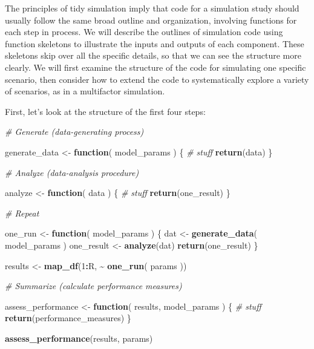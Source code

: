 \documentclass[
]{book}
\newenvironment{Shaded}{\begin{snugshade}}{\end{snugshade}}
\newcommand{\CommentTok}[1]{\textcolor[rgb]{0.56,0.35,0.01}{\textit{#1}}}
\newcommand{\ControlFlowTok}[1]{\textcolor[rgb]{0.13,0.29,0.53}{\textbf{#1}}}
\newcommand{\DecValTok}[1]{\textcolor[rgb]{0.00,0.00,0.81}{#1}}
\newcommand{\FunctionTok}[1]{\textcolor[rgb]{0.13,0.29,0.53}{\textbf{#1}}}
\newcommand{\NormalTok}[1]{#1}
\newcommand{\OtherTok}[1]{\textcolor[rgb]{0.56,0.35,0.01}{#1}}
\newcommand{\SpecialCharTok}[1]{\textcolor[rgb]{0.81,0.36,0.00}{\textbf{#1}}}
\begin{document}
The principles of tidy simulation imply that code for a simulation study should usually follow the same broad outline and organization, involving functions for each step in process.
We will describe the outlines of simulation code using function skeletons to illustrate the inputs and outputs of each component.
These skeletons skip over all the specific details, so that we can see the structure more clearly.
We will first examine the structure of the code for simulating one specific scenario, then consider how to extend the code to systematically explore a variety of scenarios, as in a multifactor simulation.

First, let's look at the structure of the first four steps:

\begin{Shaded}
\begin{Highlighting}[]
\CommentTok{\# Generate (data{-}generating process)}

\NormalTok{generate\_data }\OtherTok{\textless{}{-}} \ControlFlowTok{function}\NormalTok{( model\_params ) \{}
  \CommentTok{\# stuff}
  \FunctionTok{return}\NormalTok{(data)}
\NormalTok{\}}

\CommentTok{\# Analyze (data{-}analysis procedure)}

\NormalTok{analyze }\OtherTok{\textless{}{-}} \ControlFlowTok{function}\NormalTok{( data ) \{}
  \CommentTok{\# stuff}
  \FunctionTok{return}\NormalTok{(one\_result)}
\NormalTok{\}}

\CommentTok{\# Repeat}

\NormalTok{one\_run }\OtherTok{\textless{}{-}} \ControlFlowTok{function}\NormalTok{( model\_params ) \{}
\NormalTok{  dat }\OtherTok{\textless{}{-}} \FunctionTok{generate\_data}\NormalTok{( model\_params )}
\NormalTok{  one\_result }\OtherTok{\textless{}{-}} \FunctionTok{analyze}\NormalTok{(dat)}
  \FunctionTok{return}\NormalTok{(one\_result)}
\NormalTok{\}}

\NormalTok{results }\OtherTok{\textless{}{-}} \FunctionTok{map\_df}\NormalTok{(}\DecValTok{1}\SpecialCharTok{:}\NormalTok{R, }\SpecialCharTok{\textasciitilde{}} \FunctionTok{one\_run}\NormalTok{( params ))}

\CommentTok{\# Summarize (calculate performance measures)}

\NormalTok{assess\_performance }\OtherTok{\textless{}{-}} \ControlFlowTok{function}\NormalTok{( results, model\_params ) \{}
  \CommentTok{\# stuff}
  \FunctionTok{return}\NormalTok{(performance\_measures)}
\NormalTok{\}}

\FunctionTok{assess\_performance}\NormalTok{(results, params)}
\end{Highlighting}
\end{Shaded}
\end{document}
